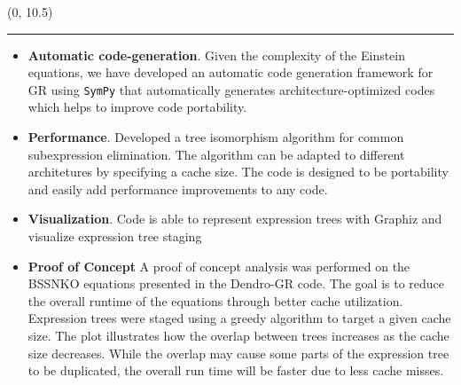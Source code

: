 \documentclass[landscape]{a0poster}
\def\Subhead#1{\noindent{\textbf{\Large\color{DarkBlue} #1}}\medskip}
\begin{document}
	\begin{textblock}{14}(0, 10.5)
		{\color{DarkBlue}\hrule}\medskip
		\Subhead{Contributions}
		\vspace{-0.2in}
		\begin{itemize}
			\item \textbf{Automatic code-generation}. Given the complexity of the Einstein equations, we have developed an automatic code generation framework for GR using \texttt{SymPy} that automatically generates architecture-optimized codes which helps to improve code portability. 
			\item \textbf{Performance}. Developed a tree isomorphism algorithm for common subexpression elimination. The algorithm can be adapted to different architetures by specifying a cache size. The code is designed to be portability and easily add performance improvements to any code.
			\item \textbf{Visualization}. 
			Code is able to represent expression trees with Graphiz and visualize expression tree staging	
			\item \textbf{Proof of Concept} A proof of concept analysis was performed on the BSSNKO equations presented in the Dendro-GR code. The goal is to reduce the overall runtime of the equations through better cache utilization. Expression trees were staged using a greedy algorithm to target a given cache size. The plot illustrates how the overlap between trees increases as the cache size decreases. While the overlap may cause some parts of the expression tree to be duplicated, the overall run time will be faster due to less cache misses.
			
			
		
		\end{itemize}
		
	\end{textblock}
	
\end{document}
